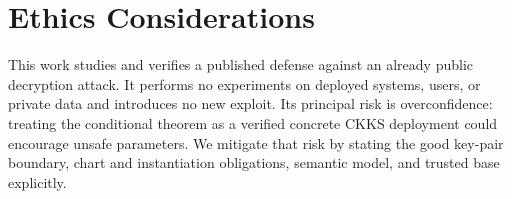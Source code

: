 
\section*{Ethics Considerations}

This work studies and verifies a published defense against an already public decryption attack.
It performs no experiments on deployed systems, users, or private data and introduces no new exploit.
Its principal risk is overconfidence: treating the conditional theorem as a verified concrete CKKS deployment could encourage unsafe parameters.
We mitigate that risk by stating the good key-pair boundary, chart and instantiation obligations, semantic model, and trusted base explicitly.
